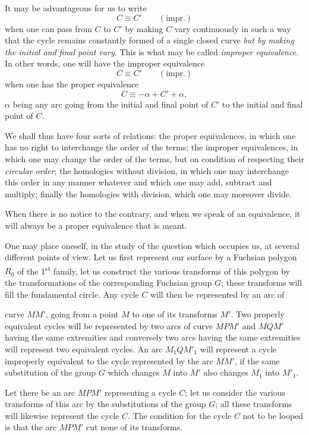 \documentclass{article}
\begin{document}
It may be advantageous for us to write
\[ C \equiv C' \qquad (\text{impr.}) \]
when one can pass from $C$ to $C'$ by making $C$ vary continuously in such a way that the cycle remains constantly formed of a single closed curve \emph{but by making the initial and final point vary}. This is what may be called \emph{improper equivalence}. In other words, one will have the improper equivalence
\[ C \equiv C' \qquad (\text{impr.}) \]
when one has the proper equivalence
\[ C \equiv -\alpha + C' + \alpha, \]
$\alpha$ being any arc going from the initial and final point of $C'$ to the initial and final point of $C$.

We shall thus have four sorts of relations: the proper equivalences, in which one has no right to interchange the order of the terms; the improper equivalences, in which one may change the order of the terms, but on condition of respecting their \emph{circular order}; the homologies without division, in which one may interchange this order in any manner whatever and which one may add, subtract and multiply; finally the homologies with division, which one may moreover divide.

When there is no notice to the contrary, and when we speak of an equivalence, it will always be a proper equivalence that is meant.

One may place oneself, in the study of the question which occupies us, at several different points of view. Let us first represent our surface by a Fuchsian polygon $R_{0}$ of the 1\textsuperscript{st} family, let us construct the various transforms of this polygon by the transformations of the corresponding Fuchsian group $G$; these transforms will fill the fundamental circle. Any cycle $C$ will then be represented by an arc of

curve $MM'$, going from a point $M$ to one of its transforms $M'$. Two properly equivalent cycles will be represented by two arcs of curve $MPM'$ and $MQM'$ having the same extremities and conversely two arcs having the same extremities will represent two equivalent cycles. An arc $M_{1}QM'_{1}$ will represent a cycle improperly equivalent to the cycle represented by the arc $MM'$, if the same substitution of the group $G$ which changes $M$ into $M'$ also changes $M_{1}$ into $M'_{1}$.

Let there be an arc $MPM'$ representing a cycle $C$; let us consider the various transforms of this arc by the substitutions of the group $G$; all these transforms will likewise represent the cycle $C$. The condition for the cycle $C$ not to be looped is that the arc $MPM'$ cut none of its transforms.
\end{document}
